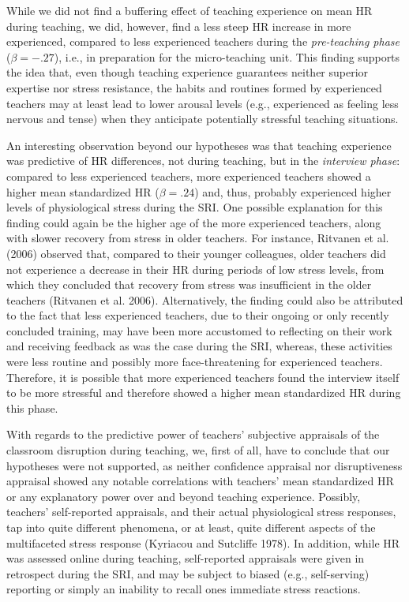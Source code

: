 \documentclass[preprint,
3p]{elsarticle} %
\begin{document}
While we did not find a buffering effect of teaching experience on mean
HR during teaching, we did, however, find a less steep HR increase in
more experienced, compared to less experienced teachers during the
\emph{pre-teaching phase} (\(\beta = -.27\)), i.e., in preparation for
the micro-teaching unit. This finding supports the idea that, even
though teaching experience guarantees neither superior expertise nor
stress resistance, the habits and routines formed by experienced
teachers may at least lead to lower arousal levels (e.g., experienced as
feeling less nervous and tense) when they anticipate potentially
stressful teaching situations.

An interesting observation beyond our hypotheses was that teaching
experience was predictive of HR differences, not during teaching, but in
the \emph{interview phase}: compared to less experienced teachers, more
experienced teachers showed a higher mean standardized HR
(\(\beta = .24\)) and, thus, probably experienced higher levels of
physiological stress during the SRI. One possible explanation for this
finding could again be the higher age of the more experienced teachers,
along with slower recovery from stress in older teachers. For instance,
Ritvanen et al. (2006) observed that, compared to their younger
colleagues, older teachers did not experience a decrease in their HR
during periods of low stress levels, from which they concluded that
recovery from stress was insufficient in the older teachers (Ritvanen et
al. 2006). Alternatively, the finding could also be attributed to the
fact that less experienced teachers, due to their ongoing or only
recently concluded training, may have been more accustomed to reflecting
on their work and receiving feedback as was the case during the SRI,
whereas, these activities were less routine and possibly more
face-threatening for experienced teachers. Therefore, it is possible
that more experienced teachers found the interview itself to be more
stressful and therefore showed a higher mean standardized HR during this
phase.

With regards to the predictive power of teachers' subjective appraisals
of the classroom disruption during teaching, we, first of all, have to
conclude that our hypotheses were not supported, as neither confidence
appraisal nor disruptiveness appraisal showed any notable correlations
with teachers' mean standardized HR or any explanatory power over and
beyond teaching experience. Possibly, teachers' self-reported
appraisals, and their actual physiological stress responses, tap into
quite different phenomena, or at least, quite different aspects of the
multifaceted stress response (Kyriacou and Sutcliffe 1978). In addition,
while HR was assessed online during teaching, self-reported appraisals
were given in retrospect during the SRI, and may be subject to biased
(e.g., self-serving) reporting or simply an inability to recall ones
immediate stress reactions.
\end{document}

